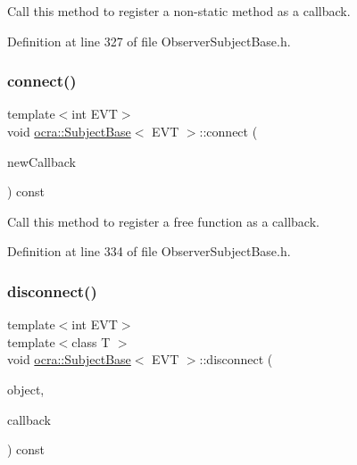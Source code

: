 Call this method to register a non-\/static method as a callback. 



Definition at line 327 of file Observer\+Subject\+Base.\+h.

\hypertarget{classocra_1_1SubjectBase_ab55ed9994f531d0e27eda42b1dc29488}{}\label{classocra_1_1SubjectBase_ab55ed9994f531d0e27eda42b1dc29488} 
\subsubsection{\texorpdfstring{connect()}{connect()}\hspace{0.1cm}{\footnotesize\ttfamily [2/2]}}
{\footnotesize\ttfamily template$<$int E\+VT$>$ \\
void \hyperlink{classocra_1_1SubjectBase}{ocra\+::\+Subject\+Base}$<$ E\+VT $>$\+::connect (\begin{DoxyParamCaption}\item[{typename \hyperlink{structocra_1_1SubjectBaseTraits}{Subject\+Base\+Traits}$<$ E\+VT, void $>$\+::callback\+\_\+type}]{new\+Callback }\end{DoxyParamCaption}) const\hspace{0.3cm}{\ttfamily [inline]}}



Call this method to register a free function as a callback. 



Definition at line 334 of file Observer\+Subject\+Base.\+h.

\hypertarget{classocra_1_1SubjectBase_af3b55ac17510d71839935a8ab15b1956}{}\label{classocra_1_1SubjectBase_af3b55ac17510d71839935a8ab15b1956} 
\subsubsection{\texorpdfstring{disconnect()}{disconnect()}\hspace{0.1cm}{\footnotesize\ttfamily [1/2]}}
{\footnotesize\ttfamily template$<$int E\+VT$>$ \\
template$<$class T $>$ \\
void \hyperlink{classocra_1_1SubjectBase}{ocra\+::\+Subject\+Base}$<$ E\+VT $>$\+::disconnect (\begin{DoxyParamCaption}\item[{T \&}]{object,  }\item[{typename \hyperlink{structocra_1_1SubjectBaseTraits}{Subject\+Base\+Traits}$<$ E\+VT, T $>$\+::callback\+\_\+type}]{callback }\end{DoxyParamCaption}) const\hspace{0.3cm}{\ttfamily [inline]}}



